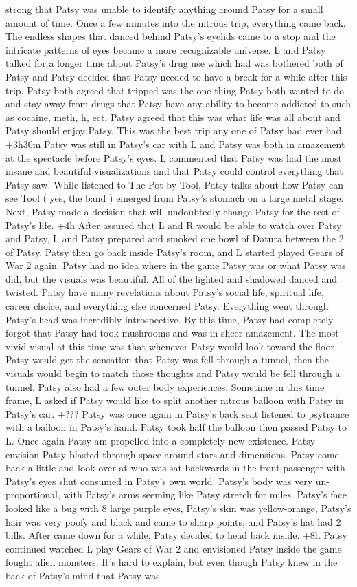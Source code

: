 \documentclass[12pt]{book}
\begin{document}
strong that Patsy was unable to identify anything around Patsy for a small amount of time. Once a few minutes into the nitrous trip, everything came back. The endless shapes that danced behind Patsy's eyelids came to a stop and the intricate patterns of eyes became a more recognizable universe. L and Patsy talked for a longer time about Patsy's drug use which had was bothered both of Patsy and Patsy decided that Patsy needed to have a break for a while after this trip. Patsy both agreed that tripped was the one thing Patsy both wanted to do and stay away from drugs that Patsy have any ability to become addicted to such as cocaine, meth, h, ect. Patsy agreed that this was what life was all about and Patsy should enjoy Patsy. This was the best trip any one of Patsy had ever had. +3h30m Patsy was still in Patsy's car with L and Patsy was both in amazement at the spectacle before Patsy's eyes. L commented that Patsy was had the most insane and beautiful visualizations and that Patsy could control everything that Patsy saw. While listened to The Pot by Tool, Patsy talks about how Patsy can see Tool ( yes, the band ) emerged from Patsy's stomach on a large metal stage. Next, Patsy made a decision that will undoubtedly change Patsy for the rest of Patsy's life. +4h After assured that L and R would be able to watch over Patsy and Patsy, L and Patsy prepared and smoked one bowl of Datura between the 2 of Patsy. Patsy then go back inside Patsy's room, and L started played Gears of War 2 again. Patsy had no idea where in the game Patsy was or what Patsy was did, but the visuals was beautiful. All of the lighted and shadowed danced and twisted. Patsy have many revelations about Patsy's social life, spiritual life, career choice, and everything else concerned Patsy. Everything went through Patsy's head was incredibly introspective. By this time, Patsy had completely forgot that Patsy had took mushrooms and was in sheer amazement. The most vivid visual at this time was that whenever Patsy would look toward the floor Patsy would get the sensation that Patsy was fell through a tunnel, then the visuals would begin to match those thoughts and Patsy would be fell through a tunnel. Patsy also had a few outer body experiences. Sometime in this time frame, L asked if Patsy would like to split another nitrous balloon with Patsy in Patsy's car. +??? Patsy was once again in Patsy's back seat listened to psytrance with a balloon in Patsy's hand. Patsy took half the balloon then passed Patsy to L. Once again Patsy am propelled into a completely new existence. Patsy envision Patsy blasted through space around stars and dimensions. Patsy come back a little and look over at who was sat backwards in the front passenger with Patsy's eyes shut consumed in Patsy's own world. Patsy's body was very un-proportional, with Patsy's arms seeming like Patsy stretch for miles. Patsy's face looked like a bug with 8 large purple eyes, Patsy's skin was yellow-orange, Patsy's hair was very poofy and black and came to sharp points, and Patsy's hat had 2 bills. After came down for a while, Patsy decided to head back inside. +8h Patsy continued watched L play Gears of War 2 and envisioned Patsy inside the game fought alien monsters. It's hard to explain, but even though Patsy knew in the back of Patsy's mind that Patsy was 
\end{document}

